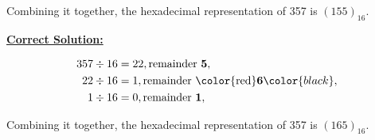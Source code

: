 \documentclass[12pt]{article}
\begin{document}
\begin{enumerate}[a.]
    Combining it together, the hexadecimal representation of 357 is $(155)_{16}$.

    \begin{mdframed}
        \underline{\textbf{Correct Solution:}}

        \bigskip

        \begin{align*}
            357 \div 16 &= 22, \text{remainder \textbf{5}},\\
            22 \div 16 &= 1, \text{remainder \color{red}\textbf{6}}\color{black},\\
            1 \div 16 &= 0, \text{remainder \textbf{1}},\\
        \end{align*}

        Combining it together, the hexadecimal representation of 357 is \color{red}\textbf{$(165)_{16}$}\color{black}.

    \end{mdframed}

\end{enumerate}
\end{document}
